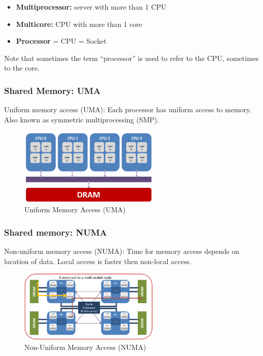 \begin{tipsblock}[Notation]
    \begin{itemize}
        \item \textbf{Multiprocessor:} server with more than 1 CPU
        \item \textbf{Multicore:} CPU with more than 1 core
        \item \textbf{Processor} = CPU = Socket
    \end{itemize}

    Note that sometimes the term “processor” is used to refer to the CPU, sometimes to the core.
\end{tipsblock}

\subsubsection{Shared Memory: UMA}

Uniform memory access (UMA): Each processor has uniform access to memory. Also known as symmetric multiprocessing (SMP).

\begin{figure}[H]
    \centering
    \includegraphics[width=0.6\textwidth]{assets/uma.png}
    \caption{Uniform Memory Access (UMA)}
    \label{fig:uma}
\end{figure}

\subsubsection{Shared memory: NUMA}

Non-uniform memory access (NUMA): Time for memory access depends on location of data. Local access is faster then non-local access.

\begin{figure}[H]
    \centering
    \includegraphics[width=0.6\textwidth]{assets/numa.png}
    \caption{Non-Uniform Memory Access (NUMA)}
    \label{fig:numa}
\end{figure}


